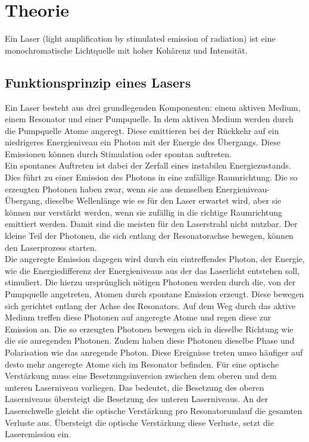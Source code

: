 \section{Theorie}
\label{sec:Theorie}
Ein Laser (light amplification by stimulated emission of radiation) ist eine monochromatische Lichtquelle mit hoher Kohärenz und Intensität.


\subsection{Funktionsprinzip eines Lasers}
Ein Laser besteht aus drei grundlegenden Komponenten: einem aktiven Medium, einem Resonator und einer Pumpquelle. In dem aktiven Medium werden durch die Pumpquelle Atome angeregt. Diese emittieren bei der Rückkehr auf ein niedrigeres
Energieniveau ein Photon mit der Energie des Übergangs. Diese Emissionen können durch Stimulation oder spontan auftreten.\\
Ein spontanes Auftreten ist dabei der Zerfall eines instabilen Energiezustands. Dies führt zu einer Emission des Photons in eine zufällige Raumrichtung. Die so erzeugten Photonen haben zwar, wenn sie aus demselben Energieniveau-Übergang,
dieselbe Wellenlänge wie es für den Laser erwartet wird, aber sie können nur verstärkt werden, wenn sie zufällig in die richtige Raumrichtung emittiert werden. Damit sind die meisten für den Laserstrahl nicht nutzbar. Der kleine Teil der
Photonen, die sich entlang der Resonatorachse bewegen, können den Laserprozess starten.\\
Die angeregte Emission dagegen wird durch ein eintreffendes Photon, der Energie, wie die Energiedifferenz der Energieniveaus aus der das Laserlicht entstehen soll, stimuliert. Die hierzu ursprünglich nötigen Photonen werden durch
die, von der Pumpquelle angetreten, Atomen durch spontane Emission erzeugt. Diese bewegen sich gerichtet entlang der Achse des Resonators. Auf dem Weg durch das aktive Medium treffen diese Photonen auf angeregte Atome und regen diese zur
Emission an. Die so erzeugten Photonen bewegen sich in dieselbe Richtung wie die sie anregenden Photonen. Zudem haben diese Photonen dieselbe Phase und Polarisation wie das anregende Photon. Diese Ereignisse treten umso häufiger auf desto
mehr angeregte Atome sich im Resonator befinden. Für eine optische Verstärkung muss eine Besetzungsinversion zwischen dem oberen und dem unteren Laserniveau vorliegen. Das bedeutet, die Besetzung des oberen Laserniveaus übersteigt die Besetzung
des unteren Laserniveaus. An der Laserschwelle gleicht die optische Verstärkung pro Resonatorumlauf die gesamten Verluste aus. Übersteigt die optische Verstärkung diese Verluste, setzt die Laseremission ein.

